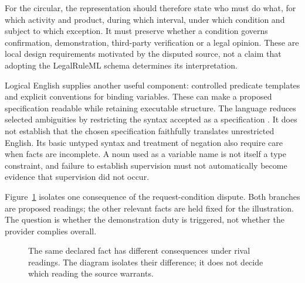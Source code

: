 For the circular, the representation should therefore state who must do what,
for which activity and product, during which interval, under which condition
and subject to which exception. It must preserve whether a condition governs
confirmation, demonstration, third-party verification or a legal opinion.
These are local design requirements motivated by the disputed source, not
a claim that adopting the LegalRuleML schema determines its interpretation.

Logical English supplies another useful component: controlled predicate
templates and explicit conventions for binding variables. These can make a
proposed specification readable while retaining executable structure.
The language reduces selected ambiguities by restricting the syntax accepted
as a specification \citep[secs.~1--2]{logicalenglish2023}. It does not
establish that the chosen specification faithfully translates unrestricted
English. Its basic untyped syntax and treatment of negation also require care
when facts are incomplete. A noun used as a variable name is not itself a
type constraint, and failure to establish supervision must not automatically
become evidence that supervision did not occur.

Figure~\ref{fig:demonstration-readings} isolates one consequence of the
request-condition dispute. Both branches are proposed readings; the other
relevant facts are held fixed for the illustration. The question is whether
the demonstration duty is triggered, not whether the provider complies
overall.

\begin{figure}[htbp]
\centering
{}
\caption{The same declared fact has different consequences under rival
readings. The diagram isolates their difference; it does not decide which
reading the source warrants.}
\label{fig:demonstration-readings}
\end{figure}

